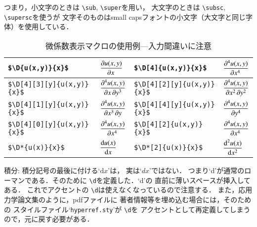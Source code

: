 \documentclass[dvipdfmx,onecolumn]{jsce}  %
\begin{document}
\begin{Description}
\noindent
つまり，小文字のときは \verb+\sub+, \verb+\super+を用い，
大文字のときは \verb+\subsc+, \verb+\supersc+を使うが
文字そのものはsmall capsフォントの小文字（大文字と同じ字体）を使用している．
%
\begin{table}
\caption{微係数表示マクロの使用例---入力間違いに注意}
\label{tab:derivative}
\renewcommand{\arraystretch}{1.7}
\begin{center}
\begin{tabular}{|l|l||l|l|}\hline
\verb+$\D{u(x,y)}{x}$+ &
$\displaystyle\D{u(x,y)}{x}$ &
\verb+$\D[4]{u(x,y)}{x}$+ &
$\displaystyle\D[4]{u(x,y)}{x}$ \\ \hline
%
\verb+$\D[4][3][y]{u(x,y)}{x}$+ &
$\displaystyle\D[4][3][y]{u(x,y)}{x}$ &
\verb+$\D[4][2][y]{u(x,y)}{x}$+ &
$\displaystyle\D[4][2][y]{u(x,y)}{x}$ \\ \hline
%
\verb+$\D[4][1][y]{u(x,y)}{x}$+ &
$\displaystyle\D[4][1][y]{u(x,y)}{x}$ &
\verb+$\D[4][4][y]{u(x,y)}{x}$+ &
$\displaystyle\D[4][4][y]{u(x,y)}{x}$ \\ \hline
%
\verb+$\D[4][0][y]{u(x,y)}{x}$+ &
$\displaystyle\D[4][0][y]{u(x,y)}{x}$ &
\verb+$\D[4][2]{u(x,y)}{x}$+ &
$\displaystyle\D[4][2]{u(x,y)}{x}$ \\ \hline
%
\verb+$\D*{u(x)}{x}$+ &
$\displaystyle\D*{u(x)}{x}$ &
\verb+$\D*[2]{u(x)}{x}$+ &
$\displaystyle\D*[2]{u(x)}{x}$ \\ \hline
\end{tabular}
\end{center}
\end{table}
%
\item[積分:] 積分記号の最後に付ける`$\mbox{d} x$'は，
実は`$d x$'ではない．
つまり`d'が通常のローマンである．そのために \verb+\d+を定義した．`d'の
直前に薄いスペースが挿入してある．
これでアクセントの \verb+\d+は使えなくなっているので注意する．
また，応用力学論文集のように，pdfファイルに
著者情報等を埋め込む場合には，そのための
スタイルファイル`{\tt hyperref.sty}'が \verb+\d+を
アクセントとして再定義してしまうので，元に戻す必要がある．


\end{Description}
\end{document}
